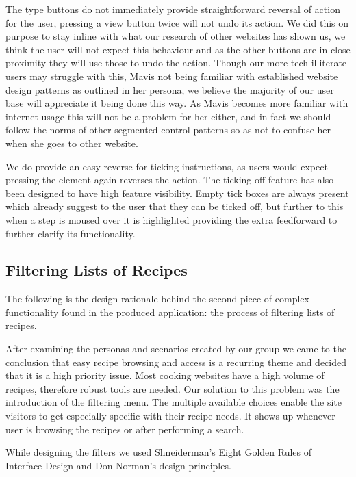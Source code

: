 The type buttons do not immediately provide straightforward reversal of action for the user, pressing a view button twice will not undo its action. We did this on purpose to stay inline with what our research of other websites has shown us, we think the user will not expect this behaviour and as the other buttons are in close proximity they will use those to undo the action. Though our more tech illiterate users may struggle with this, Mavis not being familiar with established website design patterns as outlined in her persona, we believe the majority of our user base will appreciate it being done this way. As Mavis becomes more familiar with internet usage this will not be a problem for her either, and in fact we should follow the norms of other segmented control patterns so as not to confuse her when she goes to other website.  

We do provide an easy reverse for ticking instructions, as users would expect pressing the element again reverses the action. The ticking off feature has also been designed to have high feature visibility. Empty tick boxes are always present which already suggest to the user that they can be ticked off, but further to this when a step is moused over it is highlighted providing the extra feedforward to further clarify its functionality.

\subsection{Filtering Lists of Recipes}
The following is the design rationale behind the second piece of complex functionality found in the produced application: the process of filtering lists of recipes.

After examining the personas and scenarios created by our group we came to the conclusion that easy recipe browsing and access is a recurring theme and decided that it is a high priority issue. Most cooking websites have a high volume of recipes, therefore robust tools are needed. Our solution to this problem was the introduction of the filtering menu. The multiple available choices enable the site visitors to get especially specific with their recipe needs. It shows up whenever user is browsing the recipes or after performing a search.

While designing the filters we used Shneiderman’s Eight Golden Rules of Interface Design and Don Norman’s design principles.


